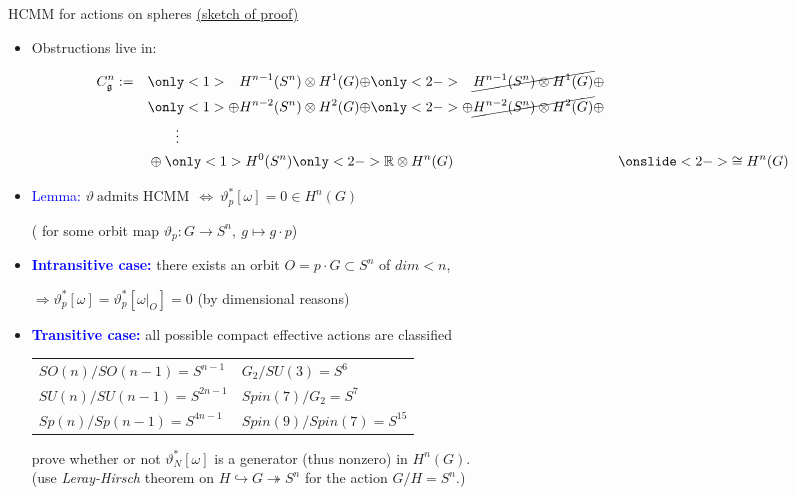 \documentclass[handout,10pt]{beamer}
\begin{document}
\begin{frame}{HCMM for actions on spheres \underline{(sketch of proof)}}
	\begin{itemize}
	\setlength\itemsep{1em}
		\item Obstructions live in: \quad 
			\begin{minipage}[t]{.5\textwidth}
			 \vspace{-2em}
		   \begin{alignat*}{3}
				 &C_\mathfrak{g}^n 
				 :=
				 &&
				 \only<1>{\phantom{\oplus} H^{n-1}(S^n)\otimes H^1(G)\oplus}
				 \only<2->{\phantom{\oplus} \cancel{H^{n-1}(S^n)\otimes H^1(G)}\oplus}
				 \\
				 & &&
				 \only<1>{\oplus H^{n-2}(S^n)\otimes H^2(G) \oplus}
				 \only<2->{\oplus \cancel{H^{n-2}(S^n)\otimes H^2(G)} \oplus}
				 \\
				 & &&
				 \qquad \vdots
				 \\
				 & &&
				 \oplus \only<1>{H^{0}(S^n)}\only<2->{\mathbb{R}}\otimes H^n(G) \phantom{\oplus}
				 &&\onslide<2->{\cong H^n(G)}
				\end{alignat*}		
			\end{minipage}
		\item<3-> \textcolor{blue}{Lemma:} $\vartheta ~\text{admits HCMM}~ ~\Leftrightarrow~  \vartheta_p^\ast[\omega]= 0 \in H^n(G)$	
			\begin{flushright}
				( for some orbit map $\vartheta_p:G\to S^n,~ g \mapsto g \cdot p$)
			\end{flushright}
	\end{itemize}
	\vfill
	\begin{itemize}
	\setlength\itemsep{1em}
		\item<4-> \textcolor{blue}{\textbf{Intransitive case:}} there exists an orbit $O = p\cdot G \subset S^n $ of $dim < n $,
			\begin{flushright}
				$\Rightarrow \vartheta^\ast_p[\omega] = \vartheta^\ast_p[\omega\vert_O] = 0$ (by dimensional reasons)
			\end{flushright}
		
		\item<5-> \textcolor{blue}{\textbf{Transitive case:}} all possible compact effective actions are classified
\begin{table}[]
\begin{tabular}{ll}
 $SO(n)/SO(n-1) = S^{n-1}$ & $G_2/ SU(3) = S^6$ \\
 $SU(n)/SU(n-1) = S^{2n-1}$ & $Spin(7)/G_2 = S^7$ \\
 $Sp(n)/Sp(n-1) = S^{4n-1}$ & $Spin(9)/Spin(7) = S^{15}$
\end{tabular}
\end{table}
	prove whether or not $\vartheta_N^\ast[\omega]$ is a generator (thus nonzero) in $H^n(G)$.
	\\
	\small
	(use \emph{Leray-Hirsch} theorem on $H \hookrightarrow G \twoheadrightarrow S^n$ for the action $G/H=S^n$.)
	\end{itemize}
	
\end{frame}
\end{document}
